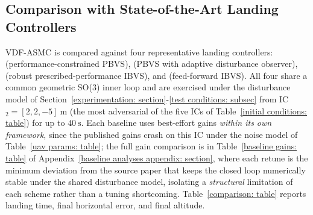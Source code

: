 \documentclass{IEEEtaes}
\begin{document}
\subsection{Comparison with State-of-the-Art Landing Controllers}
\label{comparison: subsec}
VDF-ASMC is compared against four representative landing controllers: \cite{lin2022} (performance-constrained PBVS), \cite{zhang2026} (PBVS with adaptive disturbance observer), \cite{lin2023} (robust prescribed-performance IBVS), and \cite{cho2022} (feed-forward IBVS). All four share a common geometric SO(3) inner loop and are exercised under the disturbance model of Section~\ref{experimentation: section}-\ref{test conditions: subsec} from IC$_2=[2,2,-5]~\text{m}$ (the most adversarial of the five ICs of Table~\ref{initial conditions: table}) for up to $40~\text{s}$. Each baseline uses best-effort gains \emph{within its own framework}, since the published gains crash on this IC under the noise model of Table~\ref{uav params: table}; the full gain comparison is in Table~\ref{baseline gains: table} of Appendix~\ref{baseline analyses appendix: section}, where each retune is the minimum deviation from the source paper that keeps the closed loop numerically stable under the shared disturbance model, isolating a \emph{structural} limitation of each scheme rather than a tuning shortcoming. Table~\ref{comparison: table} reports landing time, final horizontal error, and final altitude.
\end{document}
